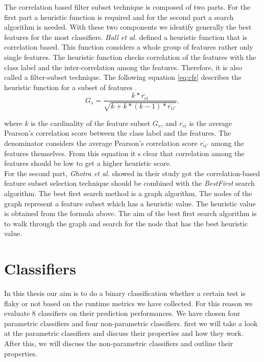 \documentclass{seal_thesis}
\begin{document}
\noindent The correlation based filter subset technique is composed of two parts. For the first part a heuristic function is required and for the second part a search algorithm is needed. With these two components we identify generally the best features for the most classifiers. \textit{Hall et al.} \cite{hall97} defined a heuristic function that is correlation based.  This function considers a whole group of features rather only single features.  The heuristic function  checks correlation of the features with the class label and the inter-correlation among the features. Therefore, it is  also called a filter-subset technique. The following equation \ref{eq:cfs} describes the heuristic function for a subset of features \cite{hall97}. \\


\begin{equation}
\label{eq:cfs}
G_s = \frac{k*\overline{r_{ci}}}{\sqrt{k + k * (k - 1) * \overline{r_{ii'}}}},
\end{equation}

\noindent where $k$ is the cardinality of the feature subset $G_s$, and $\overline{r_{ci}}$ is the average Pearson's correlation score between the class label and the features. The denominator considers the average Pearson's correlation score $\overline{r_{ii'}}$ among the features themselves. From this equation it s clear that correlation among the features should be low to get a higher heuristic score. \\

\noindent For the second part, \textit{Ghotra et al.} \cite{ghotra17} showed in their study got the correlation-based feature subset selection technique should be combined with the \textit{BestFirst} search algorithm. The best first search method is a graph algorithm.  The nodes of the graph represent a feature subset  which has a heuristic value.  The heuristic value is obtained from the formula above.  The aim of the best first search algorithm is to walk through the graph and search for the node that has the best heuristic value. 


\section{Classifiers} \label{sec:classifier}
In this thesis our aim is to do a binary classification  whether a certain test is flaky or not based on the runtime metrics we have collected. For this reason we evaluate 8 classifiers on their prediction performances. We have chosen four parametric classifiers and four non-parametric classifiers.  first we will take a look at the parametric classifiers and discuss their properties and how they work.  After this, we will discuss the non-parametric classifiers and outline their properties. \\
\end{document}
